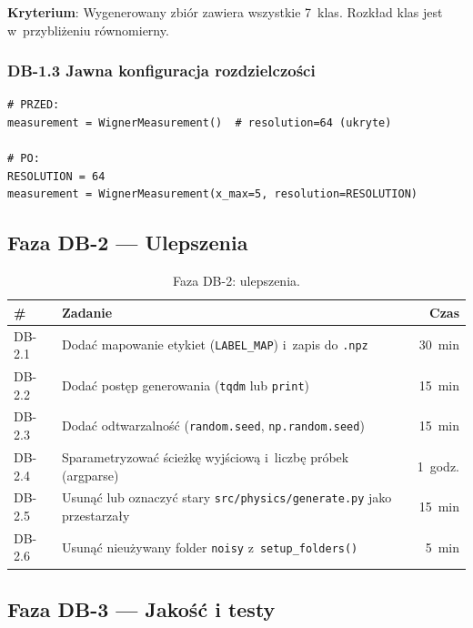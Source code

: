 \documentclass[12pt,a4paper]{article}
\begin{document}
\textbf{Kryterium}: Wygenerowany zbiór zawiera wszystkie 7~klas. Rozkład klas jest w~przybliżeniu równomierny.

\subsubsection{DB-1.3 Jawna konfiguracja rozdzielczości}

\begin{lstlisting}[caption={Jawne przekazanie rozdzielczości.}, label={lst:resolution}]
# PRZED:
measurement = WignerMeasurement()  # resolution=64 (ukryte)

# PO:
RESOLUTION = 64
measurement = WignerMeasurement(x_max=5, resolution=RESOLUTION)
\end{lstlisting}

\subsection{Faza DB-2 --- Ulepszenia}

\begin{table}[htbp]
\centering
\caption{Faza DB-2: ulepszenia.}
\begin{tabular}{@{}lp{9cm}r@{}}
\toprule
\textbf{\#} & \textbf{Zadanie} & \textbf{Czas} \\
\midrule
DB-2.1 & Dodać mapowanie etykiet (\texttt{LABEL\_MAP}) i~zapis do \texttt{.npz} & 30~min \\
DB-2.2 & Dodać postęp generowania (\texttt{tqdm} lub \texttt{print}) & 15~min \\
DB-2.3 & Dodać odtwarzalność (\texttt{random.seed}, \texttt{np.random.seed}) & 15~min \\
DB-2.4 & Sparametryzować ścieżkę wyjściową i~liczbę próbek (argparse) & 1~godz. \\
DB-2.5 & Usunąć lub oznaczyć stary \texttt{src/physics/generate.py} jako przestarzały & 15~min \\
DB-2.6 & Usunąć nieużywany folder \texttt{noisy} z~\texttt{setup\_folders()} & 5~min \\
\bottomrule
\end{tabular}
\end{table}

\subsection{Faza DB-3 --- Jakość i testy}
\end{document}
